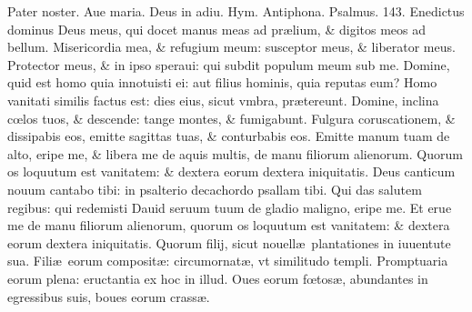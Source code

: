 \documentclass[a5paper,10pt]{book}
\def\ae{æ}
\def\oe{œ}
\begin{document}
\begin{multicols*}{2}
\par \noindent \color{red} P\color{black}ater noster. Aue maria. Deus in adiu. \color{red} Hym. Antiphona. Psalmus. \hypertarget{ps143}{143.} \color{black}
Enedictus dominus Deus meus, qui docet manus meas ad pr\ae lium, \& digitos meos ad bellum.
\newline \color{red} M\color{black}isericordia mea, \& refugium meum: susceptor meus, \& liberator meus.
\newline \color{red} P\color{black}rotector meus, \& in ipso speraui: qui subdit populum meum sub me.
\newline \color{red} D\color{black}omine, quid est homo quia innotuisti ei: aut filius hominis, quia reputas eum?
\newline \color{red} H\color{black}omo vanitati similis factus est: dies eius, sicut vmbra, pr\ae tereunt.
\newline \color{red} D\color{black}omine, inclina c\oe los tuos, \& descende: tange montes, \& fumigabunt.
\newline \color{red} F\color{black}ulgura coruscationem, \& dissipabis eos, emitte sagittas tuas, \& conturbabis eos.
\newline \color{red} E\color{black}mitte manum tuam de alto, eripe me, \& libera me de aquis multis, de manu filiorum alienorum.
\newline \color{red} Q\color{black}uorum os loquutum est vanitatem: \& dextera eorum dextera iniquitatis.
\newline \color{red} D\color{black}eus canticum nouum cantabo tibi: in psalterio decachordo psallam tibi.
\newline \color{red} Q\color{black}ui das salutem regibus: qui redemisti Dauid seruum tuum de gladio maligno, eripe me.
\newline \color{red} E\color{black}t erue me de manu filiorum alienorum, quorum os loquutum est vanitatem: \& dextera eorum dextera iniquitatis.
\newline \color{red} Q\color{black}uorum filij, sicut nouell\ae \ plantationes in iuuentute sua.
\newline \color{red} F\color{black}ili\ae \ eorum composit\ae : circumornat\ae , vt similitudo templi.
\newline \color{red} P\color{black}romptuaria eorum plena: eructantia ex hoc in illud.
\newline \color{red} O\color{black}ues eorum f\oe tos\ae , abundantes in egressibus suis, boues eorum crass\ae .

\end{multicols*}
\end{document}
